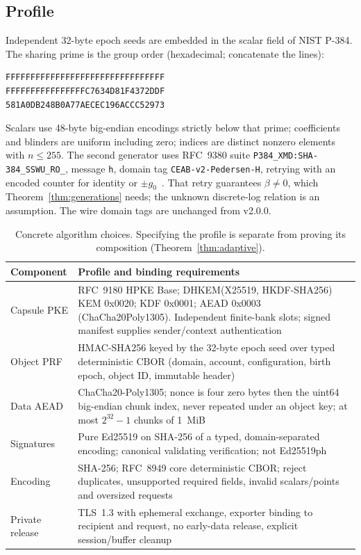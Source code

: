 \documentclass[pdflatex,sn-mathphys-num]{sn-jnl}
\theoremstyle{plain}
\theoremstyle{definition}
\newcommand{\code}[1]{\texttt{#1}}
\begin{document}
\subsection{Profile}\label{sec:profile}
Independent 32-byte epoch seeds are embedded in the scalar field of NIST P-384. The sharing prime is the group order (hexadecimal; concatenate the lines):
\begin{Verbatim}[fontsize=\small]
FFFFFFFFFFFFFFFFFFFFFFFFFFFFFFFF
FFFFFFFFFFFFFFFFC7634D81F4372DDF
581A0DB248B0A77AECEC196ACCC52973
\end{Verbatim}
Scalars use 48-byte big-endian encodings strictly below that prime; coefficients and blinders are uniform including zero; indices are distinct nonzero elements with $n\le255$. The second generator uses RFC~9380 suite \code{P384\_XMD:SHA-384\_SSWU\_RO\_}, message \code{h}, domain tag \code{CEAB-v2-Pedersen-H}, retrying with an encoded counter for identity or $\pm g_0$~\cite{rfc9380,sec2}. That retry guarantees $\beta\ne0$, which Theorem~\ref{thm:generations} needs; the unknown discrete-log relation is an assumption. The wire domain tags are unchanged from v2.0.0.

\begin{table}[htbp]
\caption{Concrete algorithm choices. Specifying the profile is separate from proving its composition (Theorem~\ref{thm:adaptive}).}\label{tab:profile}
\centering\footnotesize
\begin{tabularx}{\linewidth}{@{}p{.24\linewidth}Y@{}}\toprule
Component & Profile and binding requirements\\\midrule
Capsule PKE & RFC~9180 HPKE Base; DHKEM(X25519, HKDF-SHA256) KEM 0x0020; KDF 0x0001; AEAD 0x0003 (ChaCha20Poly1305). Independent finite-bank slots; signed manifest supplies sender/context authentication~\cite{rfc9180}\\
Object PRF & HMAC-SHA256 keyed by the 32-byte epoch seed over typed deterministic CBOR (domain, account, configuration, birth epoch, object ID, immutable header)\\
Data AEAD & ChaCha20-Poly1305; nonce is four zero bytes then the uint64 big-endian chunk index, never repeated under an object key; at most $2^{32}-1$ chunks of 1~MiB~\cite{rfc8439}\\
Signatures & Pure Ed25519 on SHA-256 of a typed, domain-separated encoding; canonical validating verification; not Ed25519ph~\cite{rfc8032}\\
Encoding & SHA-256; RFC~8949 core deterministic CBOR; reject duplicates, unsupported required fields, invalid scalars/points and oversized requests~\cite{rfc8949}\\
Private release & TLS~1.3 with ephemeral exchange, exporter binding to recipient and request, no early-data release, explicit session/buffer cleanup~\cite{rfc8446}\\\bottomrule
\end{tabularx}
\end{table}
\end{document}
